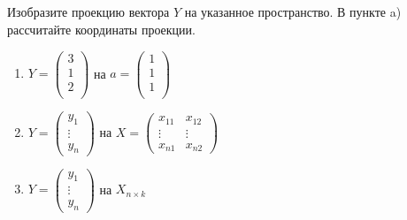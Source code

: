 \documentclass[11pt, a4paper]{extarticle}
\begin{document}
	\subsection{}
	Изобразите проекцию вектора $Y$ на указанное пространство. В пункте a) рассчитайте координаты проекции.
		\begin{enumerate}[label=\alph*)]
		\item $Y = \begin{pmatrix}
		3 \\
		1 \\
		2 \\
		\end{pmatrix}$ на $a = \begin{pmatrix}
		1 \\
		1 \\
		1 \\
		\end{pmatrix}$
		
		\item $Y = \begin{pmatrix}
		y_1 \\
		\vdots \\
		y_n
		\end{pmatrix}$ на $X = \begin{pmatrix}
		x_{11} & x_{12} \\
		\vdots & \vdots \\
		x_{n1} & x_{n2}
		\end{pmatrix}$
		
		\item $Y = \begin{pmatrix}
		y_1 \\
		\vdots \\
		y_n
		\end{pmatrix}$ на $X_{n \times k}$
		\end{enumerate}
	
\end{document}

